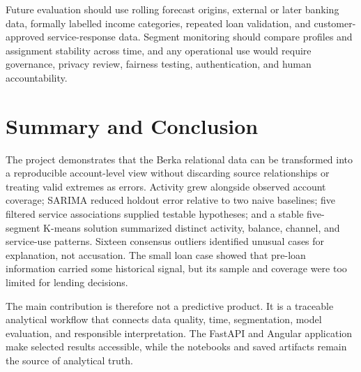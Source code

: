 \documentclass[conference]{IEEEtran}
\begin{document}
Future evaluation should use rolling forecast origins, external or later banking data, formally labelled income categories, repeated loan validation, and customer-approved service-response data. Segment monitoring should compare profiles and assignment stability across time, and any operational use would require governance, privacy review, fairness testing, authentication, and human accountability.

\balance
\section{Summary and Conclusion}

The project demonstrates that the Berka relational data can be transformed into a reproducible account-level view without discarding source relationships or treating valid extremes as errors. Activity grew alongside observed account coverage; SARIMA reduced holdout error relative to two naive baselines; five filtered service associations supplied testable hypotheses; and a stable five-segment K-means solution summarized distinct activity, balance, channel, and service-use patterns. Sixteen consensus outliers identified unusual cases for explanation, not accusation. The small loan case showed that pre-loan information carried some historical signal, but its sample and coverage were too limited for lending decisions.

The main contribution is therefore not a predictive product. It is a traceable analytical workflow that connects data quality, time, segmentation, model evaluation, and responsible interpretation. The FastAPI and Angular application make selected results accessible, while the notebooks and saved artifacts remain the source of analytical truth.

\printbibliography[title={References}]
\end{document}
